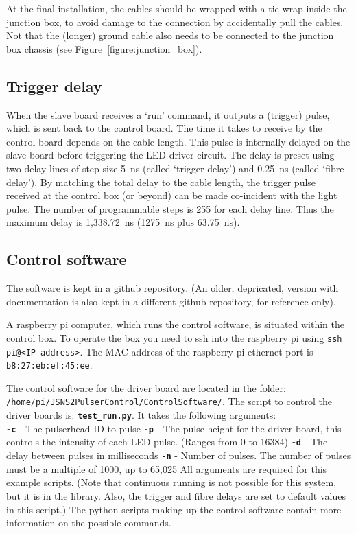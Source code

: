 At the final installation, the cables should be wrapped with a tie wrap inside the junction box, to avoid damage to the connection by accidentally pull the cables. Not that the (longer) ground cable also needs to be connected to the junction box chassis (see Figure~\ref{figure:junction_box}).

\subsection*{Trigger delay}
When the slave board receives a `run' command, it outputs a (trigger) pulse, which is sent back to the control board. The time it takes to receive by the control board depends on the cable length. This pulse is internally delayed on the slave board before triggering the LED driver circuit. The delay is preset using two delay lines of step size 5~ns (called `trigger delay') and 0.25~ns (called `fibre delay'). By matching the total delay to the cable length, the trigger pulse received at the control box (or beyond) can be made co-incident with the light pulse. The number of programmable steps is 255 for each delay line. Thus the maximum delay is 1,338.72~ns (1275~ns plus 63.75~ns).


\subsection*{Control software}

The software is kept in a  github repository\cite{GITHUB_SOFT}.
(An older, depricated, version with documentation is also kept in a different github repository\cite{GITHUB_TEST}, for reference only).
 
A raspberry pi computer, which runs the control software, is situated within the control box. To operate the box you need to ssh into the raspberry pi using \texttt{ssh pi@<IP address>}. The MAC address of the raspberry pi ethernet port is \texttt{b8:27:eb:ef:45:ee}.

The control software for the driver board are located in the folder: \texttt{/home/pi/JSNS2PulserControl/ControlSoftware/}.
The script to control the driver boards is: \texttt{\textbf{test\_run.py}}.
It takes the following arguments:\\
\newline
\texttt{\textbf{-c}} - The pulserhead ID to pulse \newline
\texttt{\textbf{-p}} - The pulse height for the driver board, this controls the intensity of each LED pulse. (Ranges from 0 to 16384)\newline
\texttt{\textbf{-d}} - The delay between pulses in milliseconds \newline
\texttt{\textbf{-n}} - Number of pulses. The number of pulses must be a multiple of 1000, up to 65,025 \newline
\newline
All arguments are required for this example scripts. (Note that continuous running is not possible for this system, but it is in the library. Also, the trigger and fibre delays are set to default values in this script.) The python scripts making up the control software contain more information on the possible commands.
